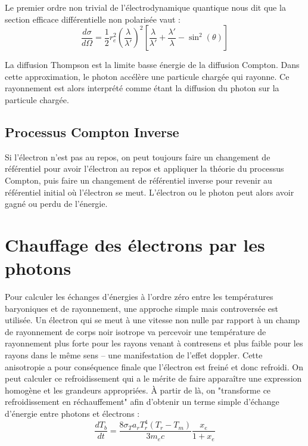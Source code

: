 \documentclass[10pt, a4paper]{report}
\numberwithin{equation}{subsection}
\begin{document}
 Le premier ordre non trivial de l'électrodynamique quantique nous dit que la section efficace différentielle non polarisée vaut :
\begin{equation} \label{eq:QED}
\boxed{\frac{d\sigma}{d\Omega} = \frac{1}{2} r_e^2 \left(\frac{\lambda}{\lambda'}\right)^{2} \left[\frac{\lambda}{\lambda'} + \frac{\lambda'}{\lambda} - \sin^2(\theta)\right]}
\end{equation}

La diffusion Thompson est la limite basse énergie de la diffusion Compton. Dans cette approximation, le photon accélère une particule chargée qui rayonne. Ce rayonnement est alors interprété comme étant la diffusion du photon sur la particule chargée. 

\subsection{Processus Compton Inverse}
Si l'électron n'est pas au repos, on peut toujours faire un changement de référentiel pour avoir l'électron au repos et appliquer la théorie du processus Compton, puis faire un changement de référentiel inverse pour revenir au référentiel initial où l'électron se meut. L'électron ou le photon peut alors avoir gagné ou perdu de l'énergie.


\section{Chauffage des électrons par les photons}

Pour calculer les échanges d'énergies à l'ordre zéro entre les températures baryoniques et de rayonnement, une approche simple mais controversée est utilisée. Un électron qui se meut à une vitesse non nulle par rapport à un champ de rayonnement de corps noir isotrope va percevoir une température de rayonnement plus forte pour les rayons venant à contresens et plus faible pour les rayons dans le même sens -- une manifestation de l'effet doppler. Cette anisotropie a pour conséquence finale que l'électron est freiné et donc refroidi. On peut calculer ce refroidissement qui a le mérite de faire apparaître une expression homogène et les grandeurs appropriées. À partir de là, on "transforme ce refroidissement en réchauffement" afin d'obtenir un terme simple d'échange d'énergie entre photons et électrons : 
\begin{equation} \label{eq:ITBTR}
\boxed{\frac{dT_b}{dt} = \frac{8\sigma_Ta_rT_r^4(T_r-T_m)}{3m_ec}\frac{x_e}{1+x_e}}
\end{equation}
\end{document}
